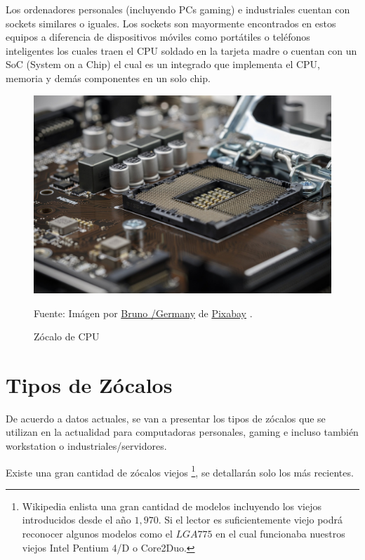 \documentclass[conference]{IEEEtran}
\begin{document}
Los ordenadores personales (incluyendo PCs gaming) e industriales cuentan con sockets similares o iguales. Los sockets son mayormente encontrados en estos equipos a diferencia de dispositivos móviles como portátiles o teléfonos inteligentes los cuales traen el CPU soldado en la tarjeta madre o cuentan con un SoC (System on a Chip) el cual es un integrado que implementa el CPU, memoria y demás componentes en un solo chip.

\begin{figure}[H]
    \centering
    \includegraphics[width=0.3\paperwidth]{images/cpu-socket.jpg}
    \caption{Zócalo de CPU} \footnotesize
    Fuente: Imágen por \href{https://pixabay.com/users/bru-no-1161770}{Bruno /Germany} de \href{https://pixabay.com}{Pixabay} \cite{pixabay-cpu-socket-2019}.
\end{figure}

\section{Tipos de Zócalos}

De acuerdo a datos actuales, se van a presentar los tipos de zócalos que se utilizan en la actualidad para computadoras personales, gaming e incluso también workstation o industriales/servidores.

\bigbreak

Existe una gran cantidad de zócalos viejos \footnote{Wikipedia \cite{wikipedia-contributors-2022} enlista una gran cantidad de modelos incluyendo los viejos introducidos desde el año $1,970$. Si el lector es suficientemente viejo podrá reconocer algunos modelos como el $LGA 775$ en el cual funcionaba nuestros viejos Intel Pentium 4/D o Core2Duo.}, se detallarán solo los más recientes.
\end{document}
